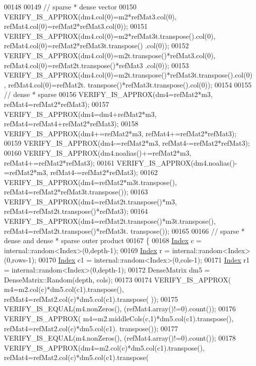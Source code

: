 \begin{DoxyCode}
00148     
00149     \textcolor{comment}{// sparse * dense vector}
00150     VERIFY\_IS\_APPROX(dm4.col(0)=m2*refMat3.col(0), refMat4.col(0)=refMat2*refMat3.col(0));
00151     VERIFY\_IS\_APPROX(dm4.col(0)=m2*refMat3t.transpose().col(0), refMat4.col(0)=refMat2*refMat3t.transpose()
      .col(0));
00152     VERIFY\_IS\_APPROX(dm4.col(0)=m2t.transpose()*refMat3.col(0), refMat4.col(0)=refMat2t.transpose()*refMat3
      .col(0));
00153     VERIFY\_IS\_APPROX(dm4.col(0)=m2t.transpose()*refMat3t.transpose().col(0), refMat4.col(0)=refMat2t.
      transpose()*refMat3t.transpose().col(0));
00154 
00155     \textcolor{comment}{// dense * sparse}
00156     VERIFY\_IS\_APPROX(dm4=refMat2*m3, refMat4=refMat2*refMat3);
00157     VERIFY\_IS\_APPROX(dm4=dm4+refMat2*m3, refMat4=refMat4+refMat2*refMat3);
00158     VERIFY\_IS\_APPROX(dm4+=refMat2*m3, refMat4+=refMat2*refMat3);
00159     VERIFY\_IS\_APPROX(dm4-=refMat2*m3, refMat4-=refMat2*refMat3);
00160     VERIFY\_IS\_APPROX(dm4.noalias()+=refMat2*m3, refMat4+=refMat2*refMat3);
00161     VERIFY\_IS\_APPROX(dm4.noalias()-=refMat2*m3, refMat4-=refMat2*refMat3);
00162     VERIFY\_IS\_APPROX(dm4=refMat2*m3t.transpose(), refMat4=refMat2*refMat3t.transpose());
00163     VERIFY\_IS\_APPROX(dm4=refMat2t.transpose()*m3, refMat4=refMat2t.transpose()*refMat3);
00164     VERIFY\_IS\_APPROX(dm4=refMat2t.transpose()*m3t.transpose(), refMat4=refMat2t.transpose()*refMat3t.
      transpose());
00165 
00166     \textcolor{comment}{// sparse * dense and dense * sparse outer product}
00167     \{
00168       \hyperlink{namespace_eigen_a62e77e0933482dafde8fe197d9a2cfde}{Index} c  = internal::random<Index>(0,depth-1);
00169       \hyperlink{namespace_eigen_a62e77e0933482dafde8fe197d9a2cfde}{Index} r  = internal::random<Index>(0,rows-1);
00170       \hyperlink{namespace_eigen_a62e77e0933482dafde8fe197d9a2cfde}{Index} c1 = internal::random<Index>(0,cols-1);
00171       \hyperlink{namespace_eigen_a62e77e0933482dafde8fe197d9a2cfde}{Index} r1 = internal::random<Index>(0,depth-1);
00172       DenseMatrix dm5  = DenseMatrix::Random(depth, cols);
00173 
00174       VERIFY\_IS\_APPROX( m4=m2.col(c)*dm5.col(c1).transpose(), refMat4=refMat2.col(c)*dm5.col(c1).transpose(
      ));
00175       VERIFY\_IS\_EQUAL(m4.nonZeros(), (refMat4.array()!=0).count());
00176       VERIFY\_IS\_APPROX( m4=m2.middleCols(c,1)*dm5.col(c1).transpose(), refMat4=refMat2.col(c)*dm5.col(c1).
      transpose());
00177       VERIFY\_IS\_EQUAL(m4.nonZeros(), (refMat4.array()!=0).count());
00178       VERIFY\_IS\_APPROX(dm4=m2.col(c)*dm5.col(c1).transpose(), refMat4=refMat2.col(c)*dm5.col(c1).transpose(

\end{DoxyCode}
